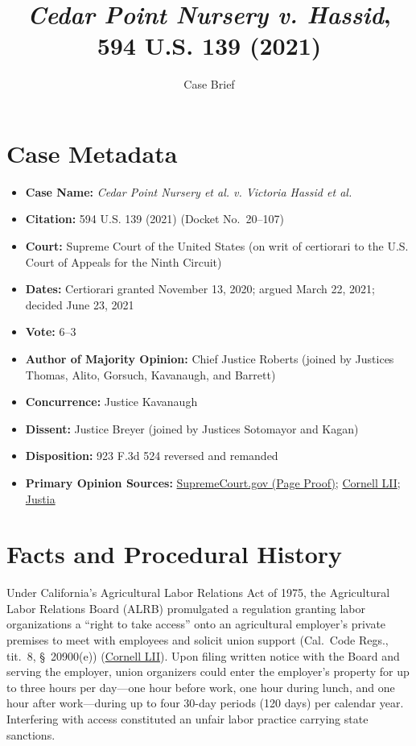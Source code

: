 \documentclass[12pt]{article}
\title{\textit{Cedar Point Nursery v. Hassid}, 594 U.S. 139 (2021)}
\author{Case Brief}
\date{}
\begin{document}
\maketitle

\section{Case Metadata}

\begin{itemize}
    \item \textbf{Case Name:} \textit{Cedar Point Nursery et al. v. Victoria Hassid et al.}
    \item \textbf{Citation:} 594 U.S. 139 (2021) (Docket No.~20--107)
    \item \textbf{Court:} Supreme Court of the United States (on writ of certiorari to the U.S. Court of Appeals for the Ninth Circuit)
    \item \textbf{Dates:} Certiorari granted November 13, 2020; argued March 22, 2021; decided June 23, 2021
    \item \textbf{Vote:} 6--3
    \item \textbf{Author of Majority Opinion:} Chief Justice Roberts (joined by Justices Thomas, Alito, Gorsuch, Kavanaugh, and Barrett)
    \item \textbf{Concurrence:} Justice Kavanaugh
    \item \textbf{Dissent:} Justice Breyer (joined by Justices Sotomayor and Kagan)
    \item \textbf{Disposition:} 923 F.3d 524 reversed and remanded
    \item \textbf{Primary Opinion Sources:} \href{https://www.supremecourt.gov/opinions/20pdf/594us1r53_0pm1.pdf}{SupremeCourt.gov (Page Proof)}; \href{https://www.law.cornell.edu/supremecourt/text/20-107}{Cornell LII}; \href{https://supreme.justia.com/cases/federal/us/594/20-107/}{Justia}
\end{itemize}

\section{Facts and Procedural History}

Under California's Agricultural Labor Relations Act of 1975, the Agricultural Labor Relations Board (ALRB) promulgated a regulation granting labor organizations a ``right to take access'' onto an agricultural employer's private premises to meet with employees and solicit union support (Cal.\ Code Regs., tit.~8, \S~20900(e)) (\href{https://www.law.cornell.edu/supremecourt/text/20-107}{Cornell LII}). Upon filing written notice with the Board and serving the employer, union organizers could enter the employer's property for up to three hours per day---one hour before work, one hour during lunch, and one hour after work---during up to four 30-day periods (120 days) per calendar year. Interfering with access constituted an unfair labor practice carrying state sanctions.
\end{document}
